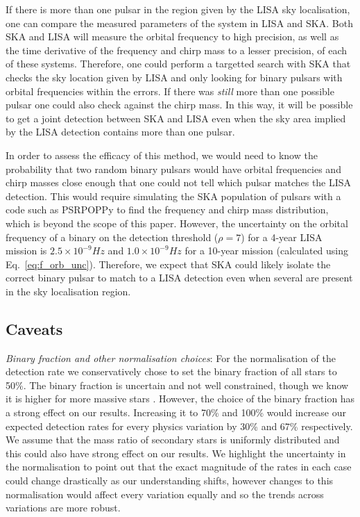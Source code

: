 If there is more than one pulsar in the region given by the LISA sky localisation, one can compare the measured parameters of the system in LISA and SKA. Both SKA and LISA will measure the orbital frequency to high precision, as well as the time derivative of the frequency and chirp mass to a lesser precision, of each of these systems. Therefore, one could perform a targetted search with SKA that checks the sky location given by LISA and only looking for binary pulsars with orbital frequencies within the errors. If there was \textit{still} more than one possible pulsar one could also check against the chirp mass. In this way, it will be possible to get a joint detection between SKA and LISA even when the sky area implied by the LISA detection contains more than one pulsar.

In order to assess the efficacy of this method, we would need to know the probability that two random binary pulsars would have orbital frequencies and chirp masses close enough that one could not tell which pulsar matches the LISA detection. This would require simulating the SKA population of pulsars with a code such as PSRPOPPy to find the frequency and chirp mass distribution, which is beyond the scope of this paper. However, the uncertainty on the orbital frequency of a binary on the detection threshold ($\rho = 7$) for a 4-year LISA mission is $2.5 \times 10^{-9} \unit{Hz}$ and $1.0 \times 10^{-9} \unit{Hz}$ for a 10-year mission (calculated using Eq.~\ref{eq:f_orb_unc}). Therefore, we expect that SKA could likely isolate the correct binary pulsar to match to a LISA detection even when several are present in the sky localisation region.

\subsection{Caveats}\label{sec:caveats}
\textit{Binary fraction and other normalisation choices}: For the normalisation of the detection rate we conservatively chose to set the binary fraction of all stars to 50\%. The binary fraction is uncertain and not well constrained, though we know it is higher for more massive stars \citep[e.g.][]{Sana+2012}. However, the choice of the binary fraction has a strong effect on our results. Increasing it to 70\% and 100\% would increase our expected detection rates for every physics variation by 30\% and 67\% respectively. We assume that the mass ratio of secondary stars is uniformly distributed and this could also have strong effect on our results. We highlight the uncertainty in the normalisation to point out that the exact magnitude of the rates in each case could change drastically as our understanding shifts, however changes to this normalisation would affect every variation equally and so the trends across variations are more robust.

